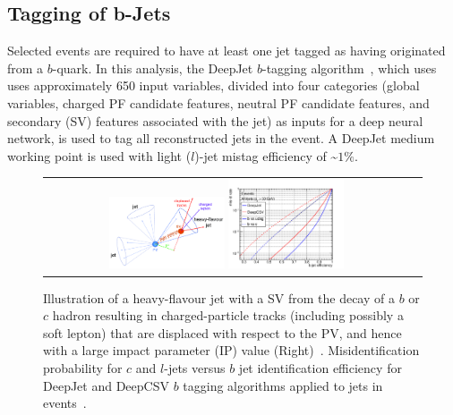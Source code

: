 \subsection{Tagging of b-Jets}
Selected events are required to have at least one jet tagged as having originated from a $b$-quark.
In this analysis, the DeepJet $b$-tagging algorithm~\cite{bib:Bols_2020}, which uses uses approximately 650 input variables, divided into four categories (global variables, charged PF candidate features, neutral PF candidate features, and secondary (SV) features associated with the jet) as inputs for a deep neural network, is used to tag all reconstructed jets in the event.
A DeepJet medium working point is used with light ($l$)-jet mistag efficiency of \sim$1\%$.
\begin{figure}[htb]
  \begin{center}
    \begin{tabular}{cc}
        \includegraphics[width=0.325\textwidth]{fig_Event_Selection/Secondary_Vertex.png}
        \includegraphics[width=0.325\textwidth]{fig_Event_Selection/DeepJet.png}
    \end{tabular}
    \caption{Illustration of a heavy-flavour jet with a SV from the decay of a $b$ or $c$ hadron resulting in charged-particle tracks (including possibly a soft lepton) that are displaced with respect to the PV, and hence with a large impact parameter (IP) value (Right)~\cite{app122010574}.
    Misidentification probability for $c$ and $l$-jets versus $b$ jet identification efficiency for DeepJet and DeepCSV $b$ tagging algorithms applied to jets in \ttbar events~\cite{app122010574}.
            }
    \label{bTagging}
  \end{center}
\end{figure}

